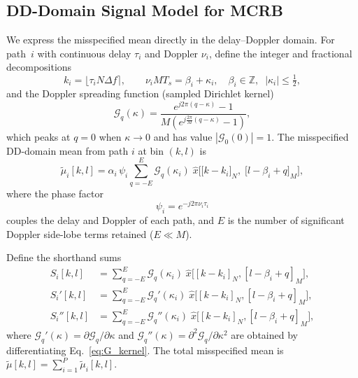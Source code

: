 \documentclass[11pt,a4paper]{article}
\newcommand{\deltaf}{\Delta f}
\begin{document}
\subsection{DD-Domain Signal Model for MCRB}

We express the misspecified mean directly in the delay--Doppler domain.
For path~$i$ with continuous delay $\tau_i$ and Doppler $\nu_i$,
define the integer and fractional decompositions
\begin{equation}
  k_i = \bigl\lfloor\tau_i N\deltaf\bigr\rceil,\qquad
  \nu_i M T_s = \beta_i + \kappa_i, \quad
  \beta_i\in\mathbb{Z},\;\;|\kappa_i|\le\tfrac{1}{2},
\end{equation}
and the Doppler spreading function (sampled Dirichlet kernel)
\begin{equation}
  \mathcal{G}_q(\kappa)
  = \frac{e^{j2\pi(q-\kappa)}-1}
         {M\!\left(e^{j\frac{2\pi}{M}(q-\kappa)}-1\right)},
  \label{eq:G_kernel}
\end{equation}
which peaks at $q=0$ when $\kappa\to 0$ and has value
$|\mathcal{G}_0(0)|=1$. The misspecified DD-domain mean from path $i$
at bin $(k,l)$ is
\begin{equation}
  \tilde{\mu}_i[k,l]
  = \alpha_i\,\psi_i
  \sum_{q=-E}^{E}\mathcal{G}_q(\kappa_i)\;
  \hat{x}\!\bigl[\bigl[k-k_i\bigr]_N,\;
                  \bigl[l-\beta_i+q\bigr]_M\bigr],
  \label{eq:mu_dd}
\end{equation}
where the phase factor
\begin{equation}
  \psi_i = e^{-j2\pi\nu_i\tau_i}
\end{equation}
couples the delay and Doppler of each path, and $E$ is the number of
significant Doppler side-lobe terms retained ($E\ll M$).

Define the shorthand sums
\begin{align}
  S_i[k,l]   &= \textstyle\sum_{q=-E}^{E}
    \mathcal{G}_q(\kappa_i)\;
    \hat{x}\!\bigl[[k\!-\!k_i]_N,[l\!-\!\beta_i\!+\!q]_M\bigr],
    \label{eq:S}\\[2pt]
  S_i'[k,l]  &= \textstyle\sum_{q=-E}^{E}
    \mathcal{G}_q'(\kappa_i)\;
    \hat{x}\!\bigl[[k\!-\!k_i]_N,[l\!-\!\beta_i\!+\!q]_M\bigr],
    \label{eq:Sp}\\[2pt]
  S_i''[k,l] &= \textstyle\sum_{q=-E}^{E}
    \mathcal{G}_q''(\kappa_i)\;
    \hat{x}\!\bigl[[k\!-\!k_i]_N,[l\!-\!\beta_i\!+\!q]_M\bigr],
    \label{eq:Spp}
\end{align}
where $\mathcal{G}_q'(\kappa)=\partial\mathcal{G}_q/\partial\kappa$
and $\mathcal{G}_q''(\kappa)=\partial^2\mathcal{G}_q/\partial\kappa^2$
are obtained by differentiating Eq.~\eqref{eq:G_kernel}. The total
misspecified mean is
$\tilde{\mu}[k,l]=\sum_{i=1}^{P}\tilde{\mu}_i[k,l]$.
\end{document}
